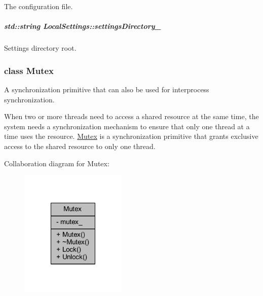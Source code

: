 The configuration file. 

\hypertarget{group___core_af27f60deac73d6236070b4b78ed2fcbf}{
\subparagraph[{settings\-Directory\-\_\-}]{\setlength{\rightskip}{0pt plus 5cm}std\-::string Local\-Settings\-::settings\-Directory\-\_\-\hspace{0.3cm}{\ttfamily [private]}}}\label{group___core_af27f60deac73d6236070b4b78ed2fcbf}


Settings directory root. 

\label{class_mutex}
\hypertarget{group___core_class_mutex}{}
\subsubsection{class Mutex}
A synchronization primitive that can also be used for interprocess synchronization. 

When two or more threads need to access a shared resource at the same time, the system needs a synchronization mechanism to ensure that only one thread at a time uses the resource. \hyperlink{group___core_class_mutex}{Mutex} is a synchronization primitive that grants exclusive access to the shared resource to only one thread. 

Collaboration diagram for Mutex\-:
\nopagebreak
\begin{figure}[H]
\begin{center}
\leavevmode
\includegraphics[width=144pt]{class_mutex__coll__graph}
\end{center}
\end{figure}
